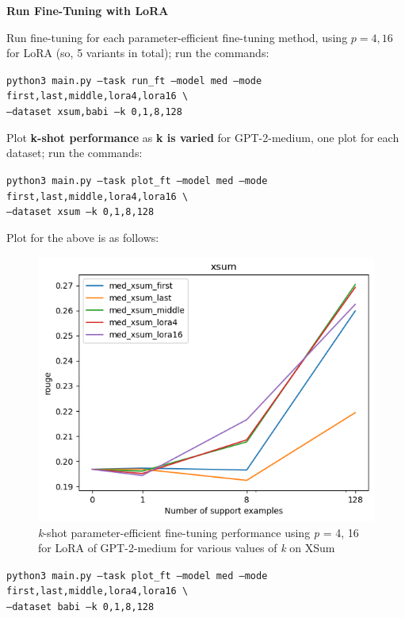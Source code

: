 \item {} {\bf Run Fine-Tuning with LoRA}

Run fine-tuning for each parameter-efficient fine-tuning method, using $p=4,16$ for LoRA (so, 5 variants in total); run the commands:

{\small \texttt{python3 main.py --task run\_ft --model med --mode first,last,middle,lora4,lora16 \textbackslash \\
\phantom{asdf}--dataset xsum,babi --k 0,1,8,128}}

Plot \textbf{k-shot performance} as \textbf{k is varied} for GPT-2-medium, one plot for each dataset; run the commands:

{\small \texttt{python3 main.py --task plot\_ft --model med --mode first,last,middle,lora4,lora16 \textbackslash \\
\phantom{asdf}--dataset xsum --k 0,1,8,128}}

Plot for the above is as follows:
\begin{figure}[H]
    \centering
    \includegraphics[width=0.75\linewidth]{./figures/q3_xsum_plot}
    \caption{\textit{k}-shot parameter-efficient fine-tuning performance using \textit{p} = 4, 16 for LoRA of GPT-2-medium for various values of \textit{k} on XSum}
\end{figure}

{\small \texttt{python3 main.py --task plot\_ft --model med --mode first,last,middle,lora4,lora16 \textbackslash \\
\phantom{asdf}--dataset babi --k 0,1,8,128}}


